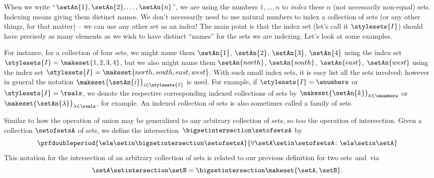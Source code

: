 \begin{remark}
    When we write ``$\setAn{1}, \setAn{2}, \dots, \setAn{n}$'', we are using the numbers $1, \dots, n$ to \emph{index} these $n$ (not necessarily non-equal) sets.
    Indexing means giving them distinct names.
    We don't necessarily need to use natural numbers to index a collection of sets (or any other things, for that matter) -- we can use any other set as an index! The main point is that the index set (let's call it $\stylesets{I}$) should have precisely as many elements as we wish to have distinct ``names'' for the sets we are indexing.
    Let's look at some examples.

    For instance, for a collection of four sets, we might name them $\setAn{1}$, $\setAn{2}$, $\setAn{3}$, $\setAn{4}$ using the index set $\stylesets{I} = \makeset{1,2, 3, 4}$, but we also might name them $\setAn{north}$, $\setAn{south}$, $\setAn{east}$, $\setAn{west}$ using the index set $\stylesets{I} = \makeset{north, south, east, west}$.
    With such small index sets, it is easy list all the sets involved; however in general the notation $\makeset{\setAn{i}}_{i \in \stylesets{I}}$ is used.
    For example, if $\stylesets{I} = \wnumbers$ or $\stylesets{I} = \reals$, we denote the respective corresponding indexed collections of sets by $\makeset{\setAn{k}}_{k \in \wnumbers}$ or $\makeset{\setAn{\lambda}}_{\lambda \in \reals}$, for example.
    An indexed collection of sets is also sometimes called a family of sets.
\end{remark}

Similar to how the operation of union may be generalized to any arbitrary collection of sets, so too the operation of intersection.
Given a collection $\setofsetsA$ of sets, we define the intersection~$\bigsetintersection \setofsetsA$ by
%
\begin{equation}
    \prfdoubleperiod{\ela \setin\bigsetintersection \setofsetsA}{\forall \setA \setin\setofsetsA \colon \ela \setin\setA}
\end{equation}
This notation for the intersection of an arbitrary collection of sets is related to our previous definition for two sets~\setA and~\setB via
\begin{equation} \setA \setintersection \setB = \bigsetintersection \makeset{ \setA, \setB }.
\end{equation}


